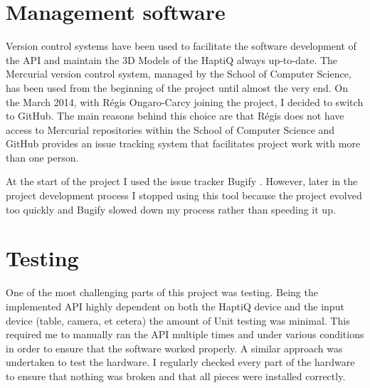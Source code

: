 \section{Management software}
Version control systems have been used to facilitate the software development of the API and maintain the 3D Models of the HaptiQ always up-to-date. The Mercurial version control system, managed by the School of Computer Science, has been used from the beginning of the project until almost the very end. On the  March 2014, with Régis Ongaro-Carcy joining the project, I decided to switch to GitHub. The main reasons behind this choice are that Régis does not have access to Mercurial repositories within the School of Computer Science and GitHub provides an issue tracking system that facilitates project work with more than one person.  

At the start of the project I used the issue tracker Bugify \cite{bugify}. However, later in the project development process I stopped using this tool because the project evolved too quickly and Bugify slowed down my process rather than speeding it up. 

\section{Testing}
One of the most challenging parts of this project was testing. Being the implemented API highly dependent on both the HaptiQ device and the input device (table, camera, et cetera) the amount of Unit testing was minimal. This required me to manually ran the API multiple times and under various conditions in order to ensure that the software worked properly. A similar approach was undertaken to test the hardware. I regularly checked every part of the hardware to ensure that nothing was broken and that all pieces were installed correctly.